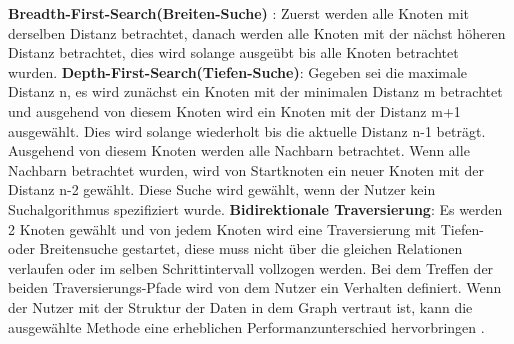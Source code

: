 \textbf {Breadth-First-Search(Breiten-Suche)} : Zuerst werden alle Knoten mit derselben Distanz betrachtet, danach werden alle Knoten mit der nächst höheren Distanz betrachtet, dies wird solange ausgeübt bis alle Knoten betrachtet wurden. \newline
\textbf {Depth-First-Search(Tiefen-Suche)}: Gegeben sei die maximale Distanz n, es wird zunächst ein Knoten mit der minimalen Distanz m betrachtet und ausgehend von diesem Knoten wird ein Knoten mit der Distanz m+1 ausgewählt. Dies wird solange wiederholt bis die aktuelle Distanz n-1 beträgt. Ausgehend von diesem Knoten werden alle Nachbarn betrachtet. Wenn alle Nachbarn betrachtet wurden, wird von Startknoten ein neuer Knoten mit der Distanz n-2 gewählt. Diese Suche wird gewählt, wenn der Nutzer kein Suchalgorithmus spezifiziert wurde. \newline
\textbf {Bidirektionale Traversierung}: Es werden 2 Knoten gewählt und von jedem Knoten wird eine Traversierung  mit Tiefen- oder Breitensuche gestartet, diese muss nicht über die gleichen Relationen verlaufen oder im selben Schrittintervall vollzogen werden. Bei dem Treffen der beiden Traversierungs-Pfade wird von dem Nutzer ein Verhalten definiert.
\newline
\newline
Wenn der Nutzer mit der Struktur der Daten in dem Graph vertraut ist, kann die ausgewählte Methode eine erheblichen Performanzunterschied  hervorbringen \parencite{vukotic2015neo4j}. 


